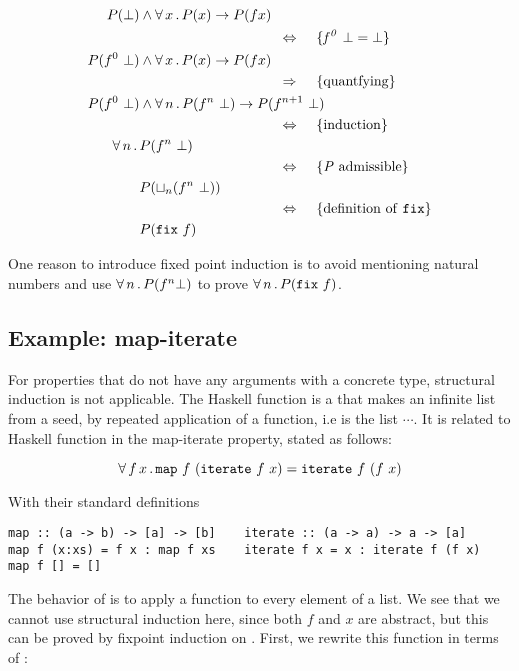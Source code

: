 \begin{align*}
P(\bot) & \wedge \fa{x} P(x) \rightarrow P(f x) \\
\desclra{\mathit{f^0 \w \bot \eq \bot}} \\
P(f^0 \w \bot) & \wedge \fa{x} P(x) \rightarrow P(f x) \\
\descra{quantfying} \\
P(f^0 \w \bot) & \wedge \fa{n} P(f^n \w \bot) \rightarrow P(f^{n+1} \w \bot) \\
\desclra{induction} \\
\fa{n} & P(f^n \w \bot) \\
\desclra{\mathit{P} \w admissible} \\
& P(\lub{n}(f^n \w \bot)) \\
\desclra{definition \w of \w \hs{fix}} \\
& P(\hs{fix} \w f) \\
\end{align*}

One reason to introduce fixed point induction is to avoid
mentioning natural numbers and use $\forall \, n \, . \, P(f^n \bot)$ to prove
$\fa{n} P(\hs{fix} \w f)$.

\subsection{Example: map-iterate}

For properties that do not have any arguments with a concrete type,
structural induction is not applicable. The Haskell function
 is a that makes an infinite list from a seed, by repeated
application of a function, i.e  is the list
 $\cdots$. It is related to Haskell function
  in the map-iterate property, stated as follows:

\begin{equation*}
\faa{f}{x} \hs{map} \w f \w (\hs{iterate} \w f \w x) \eq
           \hs{iterate} \w f \w (f \w x)
\end{equation*}

With their standard definitions

\begin{verbatim}
map :: (a -> b) -> [a] -> [b]    iterate :: (a -> a) -> a -> [a]
map f (x:xs) = f x : map f xs    iterate f x = x : iterate f (f x)
map f [] = []
\end{verbatim}

The behavior of  is to apply a function to every element of a
list. We see that we cannot use structural induction here, since both
$f$ and $x$ are abstract, but this can be proved by fixpoint induction
on . First, we rewrite this function in terms of :

